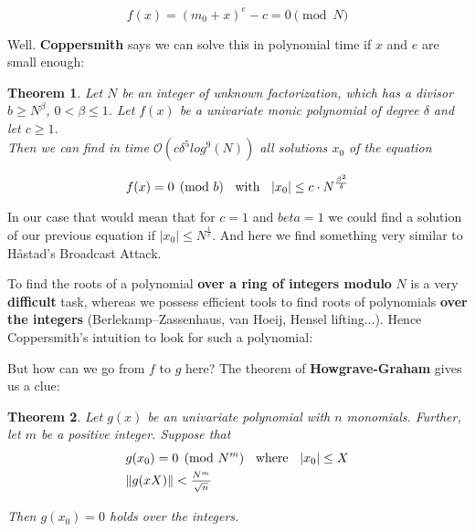 \documentclass[a4paper,11pt]{article}
\newtheorem{theorem}{Theorem}
\begin{document}
\[ f(x) = (m_0 + x)^e - c = 0 \pmod{N} \]

Well. \textbf{Coppersmith} says we can solve this in polynomial time if $x$ and $e$ are small enough:

\begin{theorem}
Let $N$ be an integer of unknown factorization, which has a divisor $b \geq N^{\beta}$, $0 < \beta \leq 1$. Let $f(x)$ be a univariate monic polynomial of degree $\delta$ and let $c \geq 1$.\\
Then we can find in time $\mathcal{O}(c\delta^5log^9(N))$ all solutions $x_0$ of the equation

\[ f(x) = 0 \pmod{b} \hspace{2mm} \text{ with } \hspace{2mm} |x_0| \leq c \cdot N^{\frac{\beta^2}{\delta}} \]
\end{theorem}

In our case that would mean that for $c=1$ and $beta=1$ we could find a solution of our previous equation if $|x_0| \leq N^{\frac{1}{e}}$. And here we find something very similar to Håstad's Broadcast Attack.

To find the roots of a polynomial \textbf{over a ring of integers modulo} $N$ is a very \textbf{difficult} task, whereas we possess efficient tools to find roots of  polynomials \textbf{over the integers} (Berlekamp–Zassenhaus, van Hoeij, Hensel lifting...). Hence Coppersmith's intuition to look for such a polynomial:



But how can we go from $f$ to $g$ here? The theorem of \textbf{Howgrave-Graham} gives us a clue:

\begin{theorem}
Let $g(x)$ be an univariate polynomial with $n$ monomials. Further, let $m$ be a positive integer. Suppose that
\setcounter{equation}{0}
\begin{align}
&g(x_0) = 0 \pmod{N^m} \hspace{2mm} \text{ where } \hspace{2mm} |x_0| \leq X\\
&\|g(xX)\| < \frac{_{N^m}}{^{\sqrt{n}}}
\end{align}

Then $g(x_0)=0$ holds over the integers.
\end{theorem}
\end{document}
